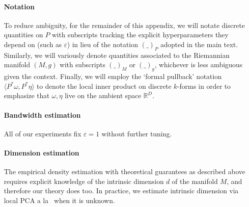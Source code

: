 \documentclass{article}
\let\todo\undefined
\let\todo\undefined
\newcommand{\todo}[1][]{}
\newcommand{\toref}[1][]{}
\theoremstyle{remark}
\theoremstyle{plain}
\begin{document}
\paragraph{Notation} To reduce ambiguity, for the remainder of this appendix, we will notate discrete quantities on \( P \) with subscripts tracking the explicit hyperparameters they depend on (such as \( \varepsilon\)) in lieu of the notation \( (\_) _{P}\) adopted in the main text. Similarly, we will variously denote quantities associated to the Riemannian manifold \( (M,g) \) with subscripts \( (\_)_{M} \) or \( (\_)_{g} \), whichever is less ambiguous given the context. Finally, we will employ the `formal pullback' notation \( \langle P^{*} \omega, P^{*} \eta \rangle  \)  to denote the local inner product on discrete \( k \)-forms in order to emphasize that \( \omega, \eta \) live on the ambient space \( \mathbb{R}^{D} \).


\paragraph{Bandwidth estimation}
All of our experiments fix \( \varepsilon=1 \) without further tuning.  


\paragraph{Dimension estimation}
 The empirical density estimation with theoretical guarantees as described above requires explicit knowledge of the intrinsic dimension \(d\) of the manifold \( M \), and therefore our theory does too. In practice, we estimate intrinsic dimension via local PCA a la~\cite{fukunaga1971algorithm} when it is unknown. 

\end{document}
